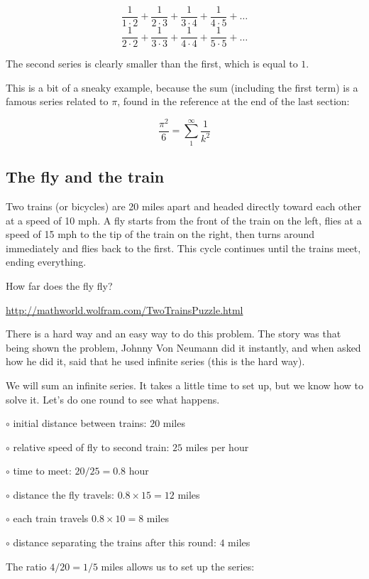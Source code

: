 \documentclass[11pt, oneside]{article}
\begin{document}
\[ \frac{1}{1 \cdot 2} + \frac{1}{2 \cdot 3} + \frac{1}{3 \cdot 4} + \frac{1}{4 \cdot 5}  + \dots \]
\[ \frac{1}{2 \cdot 2} + \frac{1}{3 \cdot 3} + \frac{1}{4 \cdot 4} + \frac{1}{5 \cdot 5}  + \dots \]

The second series is clearly smaller than the first, which is equal to $1$.

This is a bit of a sneaky example, because the sum (including the first term) is a famous series related to $\pi$, found in the reference at the end of the last section:

\[ \frac{\pi^2}{6} = \sum_1^{\infty} \frac{1}{k^2} \]

\subsection*{The fly and the train}

Two trains (or bicycles) are 20 miles apart and headed directly toward each other at a speed of 10 mph. A fly starts from the front of the train on the left, flies at a speed of 15 mph to the tip of the train on the right, then turns around immediately and flies back to the first. This cycle continues until the trains meet, ending everything.

How far does the fly fly?

\url{http://mathworld.wolfram.com/TwoTrainsPuzzle.html}

There is a hard way and an easy way to do this problem.  The story was that being shown the problem, Johnny Von Neumann did it instantly, and when asked how he did it, said that he used infinite series (this is the hard way). 

We will sum an infinite series.  It takes a little time to set up, but we know how to solve it.  Let's do one round to see what happens.
 
$\circ $  initial distance between trains:  $20$ miles

$\circ $  relative speed of fly to second train:  $25$ miles per hour

$\circ $  time to meet:  $20/25 = 0.8$ hour

$\circ $  distance the fly travels:  $0.8 \times 15 = 12$ miles

$\circ $  each train travels $0.8 \times 10 = 8$ miles

$\circ $  distance separating the trains after this round:  $4$ miles

The ratio $4/20 = 1/5$ miles allows us to set up the series:
\end{document}
